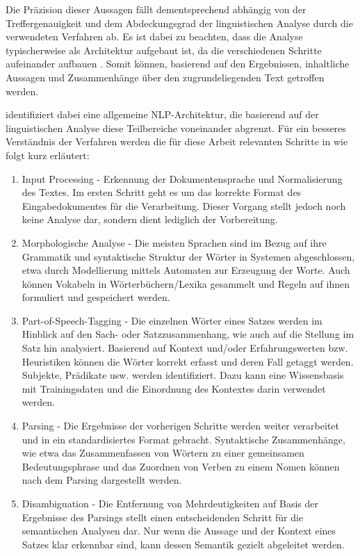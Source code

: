 \documentclass[12pt]{report}
\begin{document}
Die Präzision dieser Aussagen fällt dementsprechend abhängig von der Treffergenauigkeit und dem Abdeckungsgrad der linguistischen Analyse durch die verwendeten Verfahren ab. Es ist dabei zu beachten, dass die Analyse typischerweise als Architektur aufgebaut ist, da die verschiedenen Schritte aufeinander aufbauen \cite{cop04}. Somit können, basierend auf den Ergebnissen, inhaltliche Aussagen und Zusammenhänge über den zugrundeliegenden Text getroffen werden. 

\cite{cop04} identifiziert dabei eine allgemeine NLP-Architektur, die basierend auf der linguistischen Analyse diese Teilbereiche voneinander abgrenzt. 
Für ein besseres Verständnis der Verfahren werden die für diese Arbeit relevanten Schritte in \cite{rs18} wie folgt kurz erläutert:

\begin{enumerate}
\item
Input Processing - Erkennung der Dokumentensprache und Normalisierung des Textes. Im ersten Schritt geht es um das korrekte Format des Eingabedokumentes für die Verarbeitung. Dieser Vorgang stellt jedoch noch keine Analyse dar, sondern dient lediglich der Vorbereitung.
\item
Morphologische Analyse - Die meisten Sprachen sind im Bezug auf ihre Grammatik und syntaktische Struktur der Wörter in Systemen abgeschlossen, etwa durch Modellierung mittels Automaten zur Erzeugung der Worte. Auch können Vokabeln in Wörterbüchern/Lexika gesammelt und Regeln auf ihnen formuliert und gespeichert werden.
\item
Part-of-Speech-Tagging - Die einzelnen Wörter eines Satzes werden im Hinblick auf den Sach- oder Satzzusammenhang, wie auch auf die Stellung im Satz hin analysiert. Basierend auf Kontext und/oder Erfahrungswerten bzw. Heuristiken können die Wörter korrekt erfasst und deren Fall getaggt werden. Subjekte, Prädikate usw. werden identifiziert. Dazu kann eine Wissensbasis mit Trainingsdaten und die Einordnung des Kontextes darin verwendet werden.
\item
Parsing - Die Ergebnisse der vorherigen Schritte werden weiter verarbeitet und in ein standardisiertes Format gebracht. Syntaktische Zusammenhänge, wie etwa das Zusammenfassen von Wörtern zu einer gemeinsamen Bedeutungsphrase und das Zuordnen von Verben zu einem Nomen können nach dem Parsing dargestellt werden.
\item
Disambiguation - Die Entfernung von Mehrdeutigkeiten auf Basis der Ergebnisse des Parsings stellt einen entscheidenden Schritt für die semantischen Analysen dar. Nur wenn die Aussage und der Kontext eines Satzes klar erkennbar sind, kann dessen Semantik gezielt abgeleitet werden.

\end{enumerate}
\end{document}
